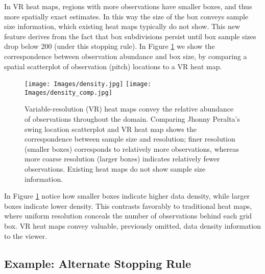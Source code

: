 In VR heat maps, regions with more observations have smaller boxes, and thus more spatially exact estimates. In this way the size of the box conveys sample size information, which existing heat maps typically do not show. This new feature derives from the fact that box subdivisions persist until box sample sizes drop below 200 (under this stopping rule). In Figure \ref{fig:density} we show the correspondence between observation abundance and box size, by comparing a spatial scatterplot of observation (pitch) locations to a VR heat map. 
        \begin{figure}[H]
      	\centering
      	\texttt{[image: Images/density.jpg]}
      	\texttt{[image: Images/density\_comp.jpg]} 
      	\caption{Variable-resolution (VR) heat maps convey the relative abundance of observations throughout the domain. Comparing Jhonny Peralta's swing location scatterplot and VR heat map shows the correspondence between sample size and resolution; finer resolution (smaller boxes) corresponds to relatively more observations, whereas more coarse resolution (larger boxes) indicates relatively fewer observations. Existing heat maps do not show sample size information.}
      	\label{fig:density}
      	\end{figure}
In Figure \ref{fig:density} notice how smaller boxes indicate higher data density, while larger boxes indicate lower density. This contrasts favorably to traditional heat maps, where uniform resolution conceals the number of observations behind each grid box. VR heat maps convey valuable, previously omitted, data density information to the viewer. 
      	
\subsection{Example: Alternate Stopping Rule} %
      	

